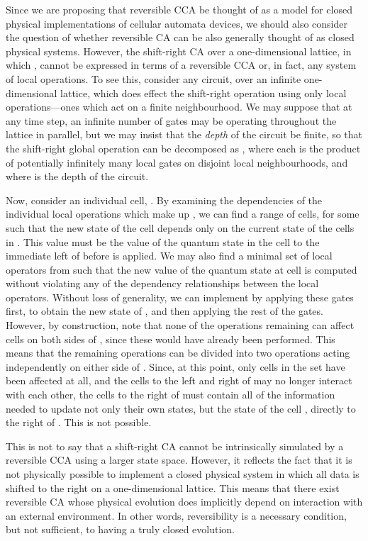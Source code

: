 \documentclass{jca}
\begin{document}
Since we are proposing that reversible CCA be thought of as a model for closed physical implementations of cellular automata devices, we should also consider the question of whether reversible CA can be also generally thought of as closed physical systems.
However, the shift-right CA over a one-dimensional lattice, in which , cannot be expressed in terms of a reversible CCA or, in fact, any system of local operations.
To see this, consider any circuit, over an infinite one-dimensional lattice, which does effect the shift-right operation using only local operations---ones which act on a finite neighbourhood.
We may suppose that at any time step, an infinite number of gates may be operating throughout the lattice in parallel, but we may insist that the \emph{depth} of the circuit be finite, so that the shift-right global operation  can be decomposed as , where each  is the product of potentially infinitely many local gates on disjoint local neighbourhoods, and where  is the depth of the circuit.

Now, consider an individual cell, .
By examining the dependencies of the individual local operations which make up , we can find a range of cells,  for some  such that the new state of the cell  depends only on the current state of the cells in .
This value must be the value of the quantum state in the cell to the immediate left of  before  is applied.
We may also find a minimal set of local operators from  such that the new value of the quantum state at cell  is computed without violating any of the dependency relationships between the local operators.
Without loss of generality, we can implement  by applying these gates first, to obtain the new state of , and then applying the rest of the gates.
However, by construction, note that none of the operations remaining can affect cells on both sides of , since these would have already been performed.
This means that the remaining operations can be divided into two operations acting independently on either side of .
Since, at this point, only cells in the set  have been affected at all, and the cells to the left and right of  may no longer interact with each other, the cells to the right of  must contain all of the information needed to update not only their own states, but the state of the cell , directly to the right of .
This is not possible.

This is not to say that a shift-right CA cannot be intrinsically simulated by a reversible CCA using a larger state space.
However, it reflects the fact that it is not physically possible to implement a closed physical system in which all data is shifted to the right on a one-dimensional lattice.
This means that there exist reversible CA whose physical evolution does implicitly depend on interaction with an external environment.
In other words, reversibility is a necessary condition, but not sufficient, to having a truly closed evolution.
\end{document}
